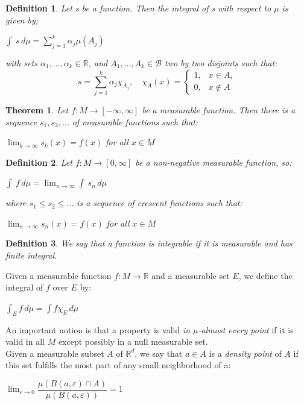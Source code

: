 \documentclass[a4paper,12pt] {article}
\newtheorem{theorem}{Theorem}[section]
\newtheorem{definition}{Definition}[section]
\begin{document}
\begin{definition}
Let s be a function. Then the integral of s with respect to $\mu$ is given by;
\begin{center}
    $\displaystyle \int\ s\, d\mu = \displaystyle \sum_{j=1}^k \alpha_j \mu(A_j)$
\end{center}

\noindent with sets $\alpha_1,\dots, \alpha_k \in \mathbb{R}$, and $A_1,\dots,A_k \in \mathcal{B}$ two by two disjoints such that:
\[
s = \sum_{j=1}^k \alpha_j \chi_{A_j}, \quad 
\chi_A(x) = \begin{cases}
1, & x \in A, \\
0, & x \notin A
\end{cases}
\]
\end{definition}

\begin{theorem}
Let $f : M \to [-\infty,\infty]$ be a measurable function. Then there is a sequence $s_1, s_2,\dots$ of measurable functions such that:
\begin{center}
    $\displaystyle \lim_{k \to \infty} s_k(x) = f(x)$ for all $x \in M$
\end{center}
\end{theorem}

\begin{definition}
Let $f : M \to [0,\infty]$ be a non-negative measurable function, so:
\begin{center}
    $\displaystyle \int\ f\, d\mu = \displaystyle \lim_{n \to \infty} \displaystyle \int\ s_n\, d\mu$
\end{center}
 where $s_1 \leq s_2 \leq \dots$ is a sequence of crescent functions such that:
\begin{center}
    $\displaystyle \lim_{n \to \infty} s_n(x) = f(x)$ for all $x \in M$
\end{center}
\end{definition}

\begin{definition}
We say that a function is integrable if it is measurable and has finite integral.
\end{definition}

 Given a measurable function $f : M \to \mathbb{R}$ and a measurable set $E$, we define the integral of $f$ over $E$ by:
\begin{center}
    $\displaystyle \int_{E} f\, d\mu = \displaystyle \int f \chi_E\, d\mu$
\end{center}

 An important notion is that a property is valid \textit{in $\mu$-almost every point} if it is valid in all $M$ except possibly in a null measurable set.\\
 Given a measurable subset $A$ of $\mathbb{R}^{d}$, we say that $a \in A$ is a \textit{density point} of $A$ if this set fulfills the most part of any small neighborhood  of a:
\begin{center}
    $\displaystyle \lim_{\varepsilon \to 0} \dfrac{\mu(B(a,\varepsilon) \cap A)}{\mu(B(a,\varepsilon))} = 1$
\end{center}
\end{document}
